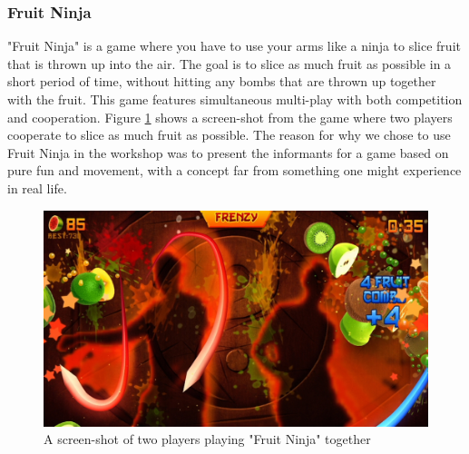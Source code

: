 \subsubsection{Fruit Ninja}
"Fruit Ninja" is a game where you have to use your arms like a ninja to slice fruit that is thrown up into the air. The goal is to slice as much fruit as possible in a short period of time, without hitting any bombs that are thrown up together with the fruit. This game features simultaneous multi-play with both competition and cooperation. Figure \ref{fig:fruitninja} shows a screen-shot from the game where two players cooperate to slice as much fruit as possible. The reason for why we chose to use Fruit Ninja in the workshop was to present the informants for a game based on pure fun and movement, with a concept far from something one might experience in real life. 

\begin{figure} [H]
\centering
\includegraphics[scale=0.4]{fruitninja}
\caption[Fruit Ninja Multi-Play]{A screen-shot of two players playing "Fruit Ninja" together \cite{fruitninja}}
\label{fig:fruitninja}
\end{figure}

